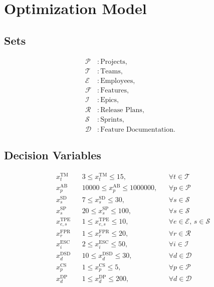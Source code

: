 \documentclass{article}
\begin{document}
\section*{Optimization Model}

\subsection*{Sets}
\begin{align}
\mathcal{P} &: \text{Projects},\\
\mathcal{T} &: \text{Teams},\\
\mathcal{E} &: \text{Employees},\\
\mathcal{F} &: \text{Features},\\
\mathcal{I} &: \text{Epics},\\
\mathcal{R} &: \text{Release Plans},\\
\mathcal{S} &: \text{Sprints},\\
\mathcal{D} &: \text{Feature Documentation}.
\end{align}

\subsection*{Decision Variables}
\begin{align}
& x_{t}^{\mathrm{TM}} && 3\le x_{t}^{\mathrm{TM}}\le15, && \forall t\in\mathcal{T}\\
& x_{p}^{\mathrm{AB}} && 10000\le x_{p}^{\mathrm{AB}}\le1000000, && \forall p\in\mathcal{P}\\
& x_{s}^{\mathrm{SD}} && 7\le x_{s}^{\mathrm{SD}}\le30, && \forall s\in\mathcal{S}\\
& x_{s}^{\mathrm{SP}} && 20\le x_{s}^{\mathrm{SP}}\le100, && \forall s\in\mathcal{S}\\
& x_{e,s}^{\mathrm{TPE}} && 1\le x_{e,s}^{\mathrm{TPE}}\le10, && \forall e\in\mathcal{E},\,s\in\mathcal{S}\\
& x_{r}^{\mathrm{FPR}} && 1\le x_{r}^{\mathrm{FPR}}\le20, && \forall r\in\mathcal{R}\\
& x_{i}^{\mathrm{ESC}} && 2\le x_{i}^{\mathrm{ESC}}\le50, && \forall i\in\mathcal{I}\\
& x_{d}^{\mathrm{DSD}} && 10\le x_{d}^{\mathrm{DSD}}\le30, && \forall d\in\mathcal{D}\\
& x_{p}^{\mathrm{CS}} && 1\le x_{p}^{\mathrm{CS}}\le5, && \forall p\in\mathcal{P}\\
& x_{d}^{\mathrm{DP}} && 1\le x_{d}^{\mathrm{DP}}\le200, && \forall d\in\mathcal{D}
\end{align}
\end{document}
